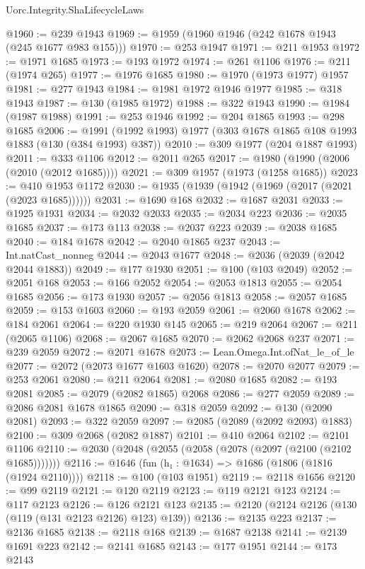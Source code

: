 \begin{lexlean}{Uorc.Integrity.ShaLifecycleLaws}
\begin{coremodule}
@1960 := @239 @1943
@1969 := @1959 (@1960 @1946 (@242 @1678 @1943 (@245 @1677 @983 @155)))
@1970 := @253 @1947
@1971 := @211 @1953
@1972 := @1971 @1685
@1973 := @193 @1972
@1974 := @261 @1106
@1976 := @211 (@1974 @265)
@1977 := @1976 @1685
@1980 := @1970 (@1973 @1977) @1957
@1981 := @277 @1943
@1984 := @1981 @1972 @1946 @1977
@1985 := @318 @1943
@1987 := @130 (@1985 @1972)
@1988 := @322 @1943
@1990 := @1984 (@1987 @1988)
@1991 := @253 @1946
@1992 := @204 @1865
@1993 := @298 @1685
@2006 := @1991 (@1992 @1993) @1977 (@303 @1678 @1865 @108 @1993 @1883 (@130 (@384 @1993) @387))
@2010 := @309 @1977 (@204 @1887 @1993)
@2011 := @333 @1106
@2012 := @2011 @265
@2017 := @1980 (@1990 (@2006 (@2010 (@2012 @1685))))
@2021 := @309 @1957 (@1973 (@1258 @1685))
@2023 := @410 @1953 @1172
@2030 := @1935 (@1939 (@1942 (@1969 (@2017 (@2021 (@2023 @1685))))))
@2031 := @1690 @168
@2032 := @1687 @2031
@2033 := @1925 @1931
@2034 := @2032 @2033
@2035 := @2034 @223
@2036 := @2035 @1685
@2037 := @173 @113
@2038 := @2037 @223
@2039 := @2038 @1685
@2040 := @184 @1678
@2042 := @2040 @1865 @237
@2043 := Int.natCast_nonneg
@2044 := @2043 @1677
@2048 := @2036 (@2039 (@2042 @2044 @1883))
@2049 := @177 @1930
@2051 := @100 (@103 @2049)
@2052 := @2051 @168
@2053 := @166 @2052
@2054 := @2053 @1813
@2055 := @2054 @1685
@2056 := @173 @1930
@2057 := @2056 @1813
@2058 := @2057 @1685
@2059 := @153 @1603
@2060 := @193 @2059
@2061 := @2060 @1678
@2062 := @184 @2061
@2064 := @220 @1930 @145
@2065 := @219 @2064
@2067 := @211 (@2065 @1106)
@2068 := @2067 @1685
@2070 := @2062 @2068 @237
@2071 := @239 @2059
@2072 := @2071 @1678
@2073 := Lean.Omega.Int.ofNat_le_of_le
@2077 := @2072 (@2073 @1677 @1603 @1620)
@2078 := @2070 @2077
@2079 := @253 @2061
@2080 := @211 @2064
@2081 := @2080 @1685
@2082 := @193 @2081
@2085 := @2079 (@2082 @1865) @2068
@2086 := @277 @2059
@2089 := @2086 @2081 @1678 @1865
@2090 := @318 @2059
@2092 := @130 (@2090 @2081)
@2093 := @322 @2059
@2097 := @2085 (@2089 (@2092 @2093) @1883)
@2100 := @309 @2068 (@2082 @1887)
@2101 := @410 @2064
@2102 := @2101 @1106
@2110 := @2030 (@2048 (@2055 (@2058 (@2078 (@2097 (@2100 (@2102 @1685)))))))
@2116 := @1646 (fun (h₁ : @1634) => @1686 (@1806 (@1816 (@1924 @2110))))
@2118 := @100 (@103 @1951)
@2119 := @2118 @1656
@2120 := @99 @2119
@2121 := @120 @2119
@2123 := @119 @2121 @123
@2124 := @117 @2123
@2126 := @126 @2121 @123
@2135 := @2120 (@2124 @2126 (@130 (@119 (@131 @2123 @2126) @123) @139))
@2136 := @2135 @223
@2137 := @2136 @1685
@2138 := @2118 @168
@2139 := @1687 @2138
@2141 := @2139 @1691 @223
@2142 := @2141 @1685
@2143 := @177 @1951
@2144 := @173 @2143

\end{coremodule}
\end{lexlean}
